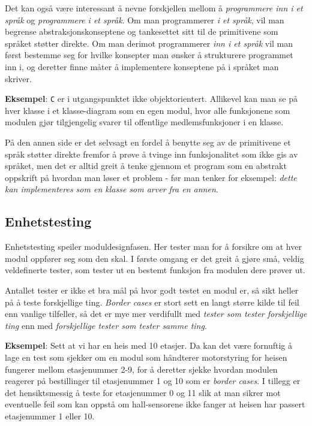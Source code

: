 Det kan også være interessant å nevne forskjellen mellom å \textit{programmere inn i et språk} og \textit{programmere i et språk}. Om man programmerer \textit{i et språk}, vil man begrense abstraksjonskonseptene og tankesettet sitt til de primitivene som språket støtter direkte. Om man derimot programmerer \textit{inn i et språk} vil man først bestemme seg for hvilke konsepter man ønsker å strukturere programmet inn i, og deretter finne måter å implementere konseptene på i språket man skriver.

\textbf{Eksempel}: \verb|C| er i utgangspunktet ikke objektorientert. Allikevel kan man se på hver klasse i et klasse-diagram som en egen modul, hvor alle funksjonene som modulen gjør tilgjengelig svarer til offentlige medlemsfunksjoner i en klasse.

På den annen side er det selvsagt en fordel å benytte seg av de primitivene et språk støtter direkte fremfor å prøve å tvinge inn funksjonalitet som ikke gis av språket, men det er alltid greit å tenke gjennom et program som en abstrakt oppskrift på hvordan man løser et problem - før man tenker for eksempel: \textit{dette kan implementeres som en klasse som arver fra en annen}.

\subsection{Enhetstesting}


Enhetstesting speiler moduldesignfasen. Her tester man for å forsikre om at hver modul oppfører seg som den skal. I første omgang er det greit å gjøre små, veldig veldefinerte tester, som tester ut en bestemt funksjon fra modulen dere prøver ut.

Antallet tester er ikke et bra mål på hvor godt testet en modul er, så sikt heller på å teste forskjellige ting. \textit{Border cases} er stort sett en langt større kilde til feil enn vanlige tilfeller, så det er mye mer verdifullt med \textit{tester som tester forskjellige ting} enn med \textit{forskjellige tester som tester samme ting}.

\textbf{Eksempel}: Sett at vi har en heis med 10 etasjer. Da kan det være fornuftig å lage en test som sjekker om en modul som håndterer motorstyring for heisen fungerer mellom etasjenummer 2-9, for å deretter sjekke hvordan modulen reagerer på bestillinger til etasjenummer 1 og 10 som er \textit{border cases}. I tillegg er det hensiktsmessig å teste for etasjenummer 0 og 11 slik at man sikrer mot eventuelle feil som kan oppstå om hall-sensorene ikke fanger at heisen har passert etasjenummer 1 eller 10.

